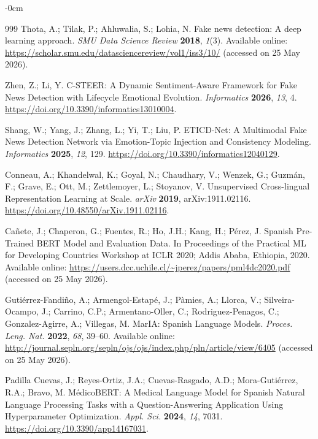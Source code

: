 \documentclass[informatics,article,submit,pdftex,moreauthors]{Definitions/mdpi}
\begin{document}
\begin{adjustwidth}{-\extralength}{0cm}
\begin{thebibliography}{999}
Thota, A.; Tilak, P.; Ahluwalia, S.; Lohia, N. Fake news detection: A deep learning approach. \textit{SMU Data Science Review} \textbf{2018}, \textit{1}(3). Available online: \href{https://scholar.smu.edu/datasciencereview/vol1/iss3/10/}{https://scholar.smu.edu/datasciencereview/vol1/iss3/10/} (accessed on 25 May 2026).
 
Zhen, Z.; Li, Y. C-STEER: A Dynamic Sentiment-Aware Framework for Fake News Detection with Lifecycle Emotional Evolution. \textit{Informatics} \textbf{2026}, \textit{13}, 4. \href{https://doi.org/10.3390/informatics13010004}{https://doi.org/10.3390/informatics13010004}.
 
Shang, W.; Yang, J.; Zhang, L.; Yi, T.; Liu, P. ETICD-Net: A Multimodal Fake News Detection Network via Emotion-Topic Injection and Consistency Modeling. \textit{Informatics} \textbf{2025}, \textit{12}, 129. \href{https://doi.org/10.3390/informatics12040129}{https://doi.org/10.3390/informatics12040129}.
 
Conneau, A.; Khandelwal, K.; Goyal, N.; Chaudhary, V.; Wenzek, G.; Guzmán, F.; Grave, E.; Ott, M.; Zettlemoyer, L.; Stoyanov, V. Unsupervised Cross-lingual Representation Learning at Scale. \textit{arXiv} \textbf{2019}, arXiv:1911.02116. \href{https://doi.org/10.48550/arXiv.1911.02116}{https://doi.org/10.48550/arXiv.1911.02116}.
 
Cañete, J.; Chaperon, G.; Fuentes, R.; Ho, J.H.; Kang, H.; Pérez, J. Spanish Pre-Trained BERT Model and Evaluation Data. In Proceedings of the Practical ML for Developing Countries Workshop at ICLR 2020; Addis Ababa, Ethiopia, 2020. Available online: \href{https://users.dcc.uchile.cl/~jperez/papers/pml4dc2020.pdf}{https://users.dcc.uchile.cl/\~{}jperez/papers/pml4dc2020.pdf} (accessed on 25 May 2026).
 
Gutiérrez-Fandiño, A.; Armengol-Estapé, J.; Pàmies, A.; Llorca, V.; Silveira-Ocampo, J.; Carrino, C.P.; Armentano-Oller, C.; Rodriguez-Penagos, C.; Gonzalez-Agirre, A.; Villegas, M. MarIA: Spanish Language Models. \textit{Proces. Leng. Nat.} \textbf{2022}, \textit{68}, 39--60. Available online: \href{http://journal.sepln.org/sepln/ojs/ojs/index.php/pln/article/view/6405}{http://journal.sepln.org/sepln/ojs/ojs/index.php/pln/article/view/6405} (accessed on 25 May 2026).
 
Padilla Cuevas, J.; Reyes-Ortiz, J.A.; Cuevas-Rasgado, A.D.; Mora-Gutiérrez, R.A.; Bravo, M. MédicoBERT: A Medical Language Model for Spanish Natural Language Processing Tasks with a Question-Answering Application Using Hyperparameter Optimization. \textit{Appl. Sci.} \textbf{2024}, \textit{14}, 7031. \href{https://doi.org/10.3390/app14167031}{https://doi.org/10.3390/app14167031}.


\end{thebibliography}
\end{adjustwidth}
\end{document}
